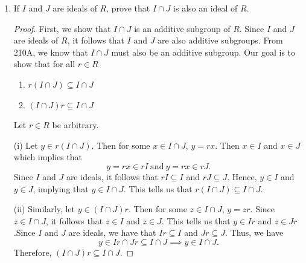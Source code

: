 \documentclass[a4paper]{article}
\begin{document}
\begin{problem}
   \begin{enumerate}
       \item[(a)] If \( I  \) and \( J  \) are ideals of \( R  \), prove that \( I \cap J  \) is also an ideal of \( R  \).
           \begin{proof}
               First, we show that \( I \cap J  \) is an additive subgroup of \( R  \). Since \( I  \) and \( J  \) are ideals of \( R  \), it follows that \( I  \) and \( J  \) are also additive subgroups. From 210A, we know that \( I \cap J  \) must also be an additive subgroup. 
           Our goal is to show that for all \( r \in R  \)
           \begin{enumerate}
               \item[(i)] \( r (I \cap J) \subseteq I \cap J  \)
                \item[(ii)] \( (I\cap J) r  \subseteq I \cap J  \)
           \end{enumerate}
           Let \( r \in R  \) be arbitrary.
        
           (i) Let \( y \in r (I \cap J) \). Then for some \( x \in I \cap J  \), \( y = rx \). Then \( x \in I  \) and \( x \in J  \) which implies that 
           \[  y = rx \in rI \ \text{and} \ y = rx \in rJ.  \]
           Since \( I \) and \( J  \) are ideals, it follows that \( rI \subseteq I  \) and \( rJ \subseteq J \). Hence, \( y \in I  \) and \( y \in J  \), implying that \( y \in I \cap J \). This tells us that \( r(I \cap J) \subseteq I \cap J \). 

           (ii) Similarly, let \( y \in (I \cap J) r  \). Then for some \( z \in I \cap J  \), \( y = z r \). Since \( z \in  I \cap J  \), it follows that \( z \in I  \) and \( z \in J  \). This tells us that \( y \in I r  \) and \( z \in J r \).Since \( I  \) and \( J  \) are ideals, we have that \( Ir \subseteq I  \) and \( Jr \subseteq J \). Thus, we have 
           \[  y \in Ir \cap Jr \subseteq I \cap J \implies y \in I \cap J.   \]
           Therefore, \( (I \cap J) r \subseteq I \cap J \).


\end{proof}
\end{enumerate}
\end{problem}
\end{document}

